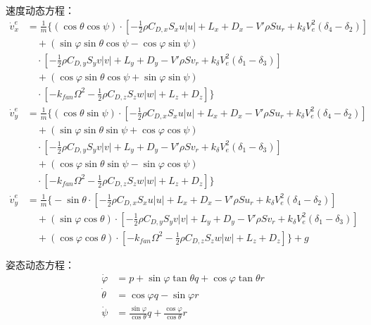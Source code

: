 速度动态方程：
\begin{equation}
    \begin{aligned}
        \dot{v}_{x}^{e} & =\frac{1}{m}\Bigg\{ (\cos{\theta}\cos{\psi}) 
        \cdot\left[-\frac{1}{2}\rho C_{D,x}S_xu|u|+L_x+D_x - V'\rho S u_r + k_\delta V_e^2(\delta_4 - \delta_2)\right] \\
        & \quad+ (\sin{\varphi}\sin{\theta}\cos{\psi}-\cos{\varphi}\sin{\psi}) \\
        & \quad\cdot\left[-\frac{1}{2}\rho C_{D,y}S_yv|v|+L_y+D_y - V'\rho S v_r + k_\delta V_e^2(\delta_1 - \delta_3)\right] \\
        & \quad+ (\cos{\varphi}\sin{\theta}\cos{\psi}+\sin{\varphi}\sin{\psi}) \\
        & \quad\cdot\left[-k_{fan}\Omega^2-\frac{1}{2}\rho C_{D,z}S_zw|w|+L_z+D_z\right]
        \Bigg\}
        \\
        \dot{v}_{y}^{e} & =\frac{1}{m}\Bigg\{ (\cos{\theta}\sin{\psi}) \cdot\left[-\frac{1}{2}\rho C_{D,x}S_xu|u|+L_x+D_x - V'\rho S u_r + k_\delta V_e^2(\delta_4 - \delta_2)\right] \\
        & \quad+ (\sin{\varphi}\sin{\theta}\sin{\psi}+\cos{\varphi}\cos{\psi}) \\
        & \quad\cdot\left[-\frac{1}{2}\rho C_{D,y}S_yv|v|+L_y+D_y - V'\rho S v_r + k_\delta V_e^2(\delta_1 - \delta_3)\right] \\
        & \quad+ (\cos{\varphi}\sin{\theta}\sin{\psi}-\sin{\varphi}\cos{\psi}) \\
        & \quad\cdot\left[-k_{fan}\Omega^2-\frac{1}{2}\rho C_{D,z}S_zw|w|+L_z+D_z\right]
        \Bigg\}
        \\
        \dot{v}_{y}^{e} & =\frac{1}{m}\Bigg\{ -\sin{\theta}\cdot\left[-\frac{1}{2}\rho C_{D,x}S_xu|u|+L_x+D_x - V'\rho S u_r + k_\delta V_e^2(\delta_4 - \delta_2)\right] \\
        & \quad+ (\sin{\varphi}\cos{\theta})\cdot\left[-\frac{1}{2}\rho C_{D,y}S_yv|v|+L_y+D_y - V'\rho S v_r + k_\delta V_e^2(\delta_1 - \delta_3)\right] \\
        & \quad+ (\cos{\varphi}\cos{\theta}) \cdot\left[-k_{fan}\Omega^2-\frac{1}{2}\rho C_{D,z}S_zw|w|+L_z+D_z\right]
        \Bigg\}+g
    \end{aligned}
    \label{eq_41}
\end{equation}

姿态动态方程：
\begin{equation}
    \begin{aligned}
        \dot{\varphi}&=p+\sin{\varphi}\tan{\theta}q+\cos{\varphi}\tan{\theta}r\\
        \dot{\theta}&=\cos{\varphi}q-\sin{\varphi}r\\
        \dot{\psi}&=\frac{\sin{\varphi}}{\cos{\theta}}q+\frac{\cos{\varphi}}{\cos{\theta}}r
    \end{aligned}
    \label{eq_42}
\end{equation}

